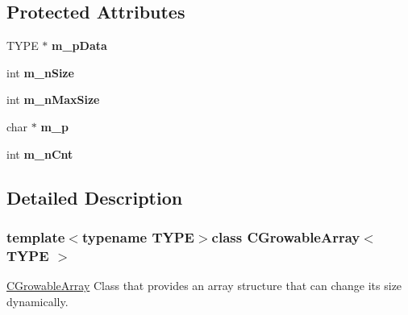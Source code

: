 \subsection*{Protected Attributes}
\begin{DoxyCompactItemize}
\item 
\hypertarget{class_c_growable_array_aae806f24201f88709a0c241f0f832cf4}{T\+Y\+P\+E $\ast$ {\bfseries m\+\_\+p\+Data}}\label{class_c_growable_array_aae806f24201f88709a0c241f0f832cf4}

\item 
\hypertarget{class_c_growable_array_a6ae5d526df0f65163cae53792a6c9616}{int {\bfseries m\+\_\+n\+Size}}\label{class_c_growable_array_a6ae5d526df0f65163cae53792a6c9616}

\item 
\hypertarget{class_c_growable_array_a8fe1ea6b03bbb8a0dca92c4fb7046c5d}{int {\bfseries m\+\_\+n\+Max\+Size}}\label{class_c_growable_array_a8fe1ea6b03bbb8a0dca92c4fb7046c5d}

\item 
\hypertarget{class_c_growable_array_a64decfe29ea498bd684249842c4180f7}{char $\ast$ {\bfseries m\+\_\+p}}\label{class_c_growable_array_a64decfe29ea498bd684249842c4180f7}

\item 
\hypertarget{class_c_growable_array_acf22e2a12eec0f4ce733f3a6fc24092b}{int {\bfseries m\+\_\+n\+Cnt}}\label{class_c_growable_array_acf22e2a12eec0f4ce733f3a6fc24092b}

\end{DoxyCompactItemize}


\subsection{Detailed Description}
\subsubsection*{template$<$typename T\+Y\+P\+E$>$class C\+Growable\+Array$<$ T\+Y\+P\+E $>$}



  \hyperlink{class_c_growable_array}{C\+Growable\+Array}  Class that provides an array structure that can change its size dynamically. 

